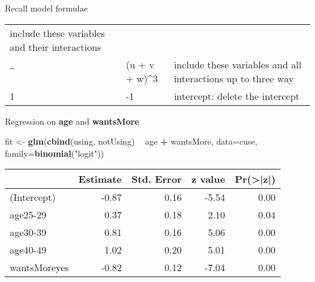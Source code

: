 \documentclass[
  ignorenonframetext,
]{beamer}
\newenvironment{Shaded}{\begin{snugshade}}{\end{snugshade}}
\newcommand{\DataTypeTok}[1]{\textcolor[rgb]{0.13,0.29,0.53}{#1}}
\newcommand{\KeywordTok}[1]{\textcolor[rgb]{0.13,0.29,0.53}{\textbf{#1}}}
\newcommand{\NormalTok}[1]{#1}
\newcommand{\OperatorTok}[1]{\textcolor[rgb]{0.81,0.36,0.00}{\textbf{#1}}}
\newcommand{\StringTok}[1]{\textcolor[rgb]{0.31,0.60,0.02}{#1}}
\begin{document}
\begin{frame}{Recall model formulae}
\begin{longtable}[]{@{}lll@{}}
\begin{minipage}[t]{0.53\columnwidth}
include these variables and their interactions\strut
\end{minipage}\tabularnewline
\begin{minipage}[t]{0.14\columnwidth}\raggedright
\^{}\strut
\end{minipage} & \begin{minipage}[t]{0.24\columnwidth}\raggedright
(u + v + w)\^{}3\strut
\end{minipage} & \begin{minipage}[t]{0.53\columnwidth}\raggedright
include these variables and all interactions up to three way\strut
\end{minipage}\tabularnewline
\begin{minipage}[t]{0.14\columnwidth}\raggedright
1\strut
\end{minipage} & \begin{minipage}[t]{0.24\columnwidth}\raggedright
-1\strut
\end{minipage} & \begin{minipage}[t]{0.53\columnwidth}\raggedright
intercept: delete the intercept\strut
\end{minipage}\tabularnewline
\bottomrule
\end{longtable}

\end{frame}

\begin{frame}[fragile]{Regression on \textbf{age} and
\textbf{wantsMore}}
\protect\hypertarget{regression-on-age-and-wantsmore}{}

\begin{Shaded}
\begin{Highlighting}[]
\NormalTok{fit <-}\StringTok{ }\KeywordTok{glm}\NormalTok{(}\KeywordTok{cbind}\NormalTok{(using, notUsing) }\OperatorTok{~}\StringTok{ }\NormalTok{age }\OperatorTok{+}\StringTok{ }\NormalTok{wantsMore, }
           \DataTypeTok{data=}\NormalTok{cuse, }\DataTypeTok{family=}\KeywordTok{binomial}\NormalTok{(}\StringTok{"logit"}\NormalTok{))}
\end{Highlighting}
\end{Shaded}

\begin{table}[H]
\centering
\begin{tabular}[t]{l|r|r|r|r}
\hline
  & Estimate & Std. Error & z value & Pr(>|z|)\\
\hline
(Intercept) & -0.87 & 0.16 & -5.54 & 0.00\\
\hline
age25-29 & 0.37 & 0.18 & 2.10 & 0.04\\
\hline
age30-39 & 0.81 & 0.16 & 5.06 & 0.00\\
\hline
age40-49 & 1.02 & 0.20 & 5.01 & 0.00\\
\hline
wantsMoreyes & -0.82 & 0.12 & -7.04 & 0.00\\
\hline
\end{tabular}
\end{table}

\end{frame}
\end{document}

